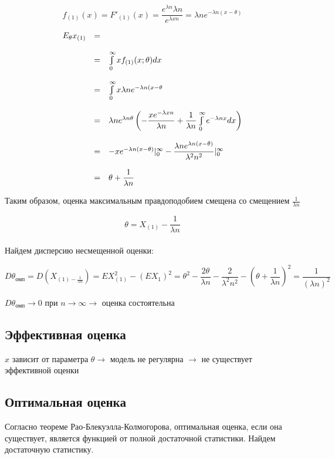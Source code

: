 \documentclass[a4paper,12pt, oneside]{book}
\let\int\varint
\begin{document}
$$
f_{(1)} (x) = F'_(1)(x) = \dfrac{e^{\lambda n} \lambda n}{e^{\lambda x n}} = \lambda n e^{-\lambda n (x- \theta)}
$$


$$
\begin{array}{lcl}
	E_\theta x_{(1)} &=\\
	\\
	&=& \int\limits_{0}^{\infty} x f_{(1)} (x; \theta) dx \\
	\\
	&=&\int\limits_{0}^{\infty} x \lambda n e^{-\lambda n (x- \theta} \\
	\\
	&=&\lambda n e^{\lambda n \theta} \left( - \dfrac{x e^{- \lambda x n}}{\lambda n} + \dfrac{1}{\lambda n} \int\limits_{0}^{\infty} e^{-\lambda n x}dx \right)  \\
	\\
	&=&-x e^{-\lambda n (x- \theta)}|_0^\infty - \dfrac{\lambda n e^{\lambda n (x - \theta)}}{\lambda^2 n^2}|_0^\infty\\
	\\
	&=&\theta + \dfrac{1}{\lambda n}
\end{array}
$$

Таким образом, оценка максимальным правдоподобием смещена со смещением $ \frac{1}{\lambda n} $

$$
\theta = X_{(1)} - \frac{1}{\lambda n}
$$
\\

Найдем дисперсию несмещенной оценки:

$$
D\theta_\text{омп} = D\left( X_{(1) - \frac{1}{\lambda n}}\right) = EX_{(1)}^2 - (EX_{1})^2 = \theta^2 - \dfrac{2 \theta}{\lambda n} - \dfrac{2}{\lambda^2 n^2} - \left( \theta + \dfrac{1}{\lambda n}\right)^2 = \dfrac{1}{(\lambda n)^2}
$$

$D\theta_\text{омп} \to 0  $ при $ n \to \infty \to $ оценка состоятельна

\subsection{Эффективная оценка}

$ x $ зависит от параметра $\theta \to$ модель не регулярна $ \to $ не существует эффективной оценки 

\subsection{Оптимальная оценка}

Согласно теореме Рао-Блекуэлла-Колмогорова, оптимальная оценка, если она существует, является
функцией от полной достаточной статистики. Найдем достаточную статистику.
\\
\end{document}
